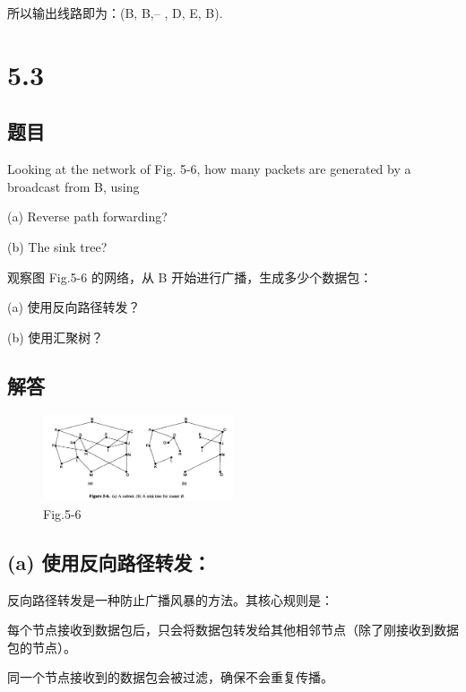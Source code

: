所以输出线路即为：(B, B,– , D, E, B).

\section{5.3}

\subsection*{题目}
Looking at the network of Fig. 5-6, how many packets are generated by a broadcast from B, using 

(a) Reverse path forwarding?

(b) The sink tree?

观察图 Fig.5-6 的网络，从 B 开始进行广播，生成多少个数据包：

(a) 使用反向路径转发？

(b) 使用汇聚树？

\subsection*{解答}

\begin{figure}[H]
  \centering
  \includegraphics[width=0.5\textwidth]{lec5/5-6.png}
  \caption{Fig.5-6}
\end{figure}

\subsection*{(a) 使用反向路径转发：}

反向路径转发是一种防止广播风暴的方法。其核心规则是：

每个节点接收到数据包后，只会将数据包转发给其他相邻节点（除了刚接收到数据包的节点）。

同一个节点接收到的数据包会被过滤，确保不会重复传播。

